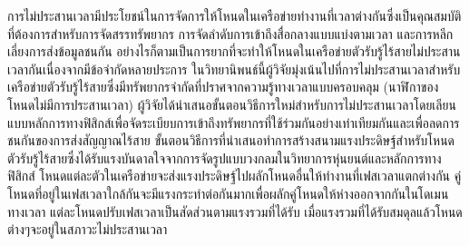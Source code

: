 \begin{thaiabstract}
การ{\wbr}ไม่{\wbr}ประสาน{\wbr}เวลา{\wbr}มี{\wbr}ประโยชน์{\wbr}ใน{\wbr}การ{\wbr}จัดการ{\wbr}ให้{\wbr}โหน{\wbr}ด{\wbr}ใน{\wbr}เครือข่าย{\wbr}ทำงาน{\wbr}ที่{\wbr}เวลา{\wbr}ต่าง{\wbr}กัน{\wbr}ซึ่ง{\wbr}เป็นคุณ{\wbr}สมบัติ{\wbr}ที่{\wbr}ต้องการ{\wbr}สำหรับ{\wbr}การ{\wbr}จัดสรร{\wbr}ทรัพยากร การ{\wbr}จัด{\wbr}ลำดับ{\wbr}การ{\wbr}เข้าถึง{\wbr}สื่อกลาง{\wbr}แบบ{\wbr}แบ่ง{\wbr}ตาม{\wbr}เวลา และ{\wbr}การ{\wbr}หลีกเลี่ยง{\wbr}การ{\wbr}ส่ง{\wbr}ข้อมูล{\wbr}ชน{\wbr}กัน อย่างไรก็ตาม{\wbr}เป็น{\wbr}การ{\wbr}ยาก{\wbr}ที่{\wbr}จะ{\wbr}ทำ{\wbr}ให้{\wbr}โหน{\wbr}ด{\wbr}ใน{\wbr}เครือข่าย{\wbr}ตัวรับ{\wbr}รู้{\wbr}ไร้{\wbr}สาย{\wbr}ไม่{\wbr}ประสาน{\wbr}เวลา{\wbr}กัน{\wbr}เนื่องจาก{\wbr}มี{\wbr}ข้อจำกัด{\wbr}หลาย{\wbr}ประการ ใน{\wbr}วิทยานิพนธ์{\wbr}นี้{\wbr}ผู้{\wbr}วิจัยมุ่งเน้น{\wbr}ไป{\wbr}ที่{\wbr}การ{\wbr}ไม่{\wbr}ประสาน{\wbr}เวลา{\wbr}สำหรับ{\wbr}เครือข่าย{\wbr}ตัวรับ{\wbr}รู้{\wbr}ไร้{\wbr}สาย{\wbr}ซึ่ง{\wbr}มี{\wbr}ทรัพยากร{\wbr}จำกัด{\wbr}ที่{\wbr}ปราศจาก{\wbr}ความ{\wbr}รู้{\wbr}ทาง{\wbr}เวลา{\wbr}แบบ{\wbr}ครอบคลุม (นาฬิกา{\wbr}ของ{\wbr}โหน{\wbr}ด{\wbr}ไม่{\wbr}มี{\wbr}การ{\wbr}ประสาน{\wbr}เวลา) ผู้{\wbr}วิจัย{\wbr}ได้{\wbr}นำเสนอ{\wbr}ขั้นตอนวิธี{\wbr}การ{\wbr}ใหม่{\wbr}สำหรับ{\wbr}การ{\wbr}ไม่{\wbr}ประสาน{\wbr}เวลา{\wbr}โดย{\wbr}เลียน{\wbr}แบบ{\wbr}หลักการ{\wbr}ทาง{\wbr}ฟิสิกส์{\wbr}เพื่อ{\wbr}จัด{\wbr}ระเบียบการ{\wbr}เข้าถึง{\wbr}ทรัพยากร{\wbr}ที่{\wbr}ใช้{\wbr}ร่วม{\wbr}กัน{\wbr}อย่าง{\wbr}เท่าเทียม{\wbr}กัน{\wbr}และ{\wbr}เพื่อ{\wbr}ลด{\wbr}การ{\wbr}ชน{\wbr}กัน{\wbr}ของ{\wbr}การ{\wbr}ส่ง{\wbr}สัญญาณ{\wbr}ไร้{\wbr}สาย ขั้นตอนวิธี{\wbr}การ{\wbr}ที่{\wbr}นำเสนอ{\wbr}ทำ{\wbr}การ{\wbr}สร้าง{\wbr}สนาม{\wbr}แรง{\wbr}ประดิษฐ์{\wbr}สำหรับ{\wbr}โหน{\wbr}ด{\wbr}ตัวรับ{\wbr}รู้{\wbr}ไร้{\wbr}สาย{\wbr}ซึ่ง{\wbr}ได้{\wbr}รับ{\wbr}แรง{\wbr}บันดาลใจ{\wbr}จาก{\wbr}การ{\wbr}จัด{\wbr}รูปแบบ{\wbr}วง{\wbr}กลม{\wbr}ใน{\wbr}วิทยาการ{\wbr}หุ่นยนต์{\wbr}และ{\wbr}หลักการ{\wbr}ทาง{\wbr}ฟิสิกส์ โหน{\wbr}ด{\wbr}แต่ละ{\wbr}ตัว{\wbr}ใน{\wbr}เครือข่าย{\wbr}จะ{\wbr}ส่ง{\wbr}แรง{\wbr}ประดิษฐ์{\wbr}ไป{\wbr}ผลัก{\wbr}โหน{\wbr}ด{\wbr}อื่น{\wbr}ให้{\wbr}ทำงาน{\wbr}ที่{\wbr}เฟส{\wbr}เวลา{\wbr}แตกต่าง{\wbr}กัน คู่{\wbr}โหน{\wbr}ด{\wbr}ที่อยู่{\wbr}ใน{\wbr}เฟส{\wbr}เวลา{\wbr}ใกล้{\wbr}กัน{\wbr}จะ{\wbr}มี{\wbr}แรง{\wbr}กระทำ{\wbr}ต่อ{\wbr}กัน{\wbr}มาก{\wbr}เพื่อ{\wbr}ผลัก{\wbr}คู่{\wbr}โหน{\wbr}ด{\wbr}ให้{\wbr}ห่าง{\wbr}ออก{\wbr}จาก{\wbr}กัน{\wbr}ใน{\wbr}โด{\wbr}เมน{\wbr}ทาง{\wbr}เวลา{\wbr}
แต่ละ{\wbr}โหน{\wbr}ด{\wbr}ปรับ{\wbr}เฟส{\wbr}เวลา{\wbr}เป็น{\wbr}สัดส่วน{\wbr}ตาม{\wbr}แรง{\wbr}รวม{\wbr}ที่{\wbr}ได้{\wbr}รับ เมื่อ{\wbr}แรง{\wbr}รวม{\wbr}ที่{\wbr}ได้{\wbr}รับ{\wbr}สม{\wbr}ดุล{\wbr}แล้ว{\wbr}โหน{\wbr}ดต่างๆ{\wbr}จะ{\wbr}อยู่{\wbr}ใน{\wbr}สภาวะ{\wbr}ไม่{\wbr}ประสาน{\wbr}เวลา{\wbr}

\end{thaiabstract}
